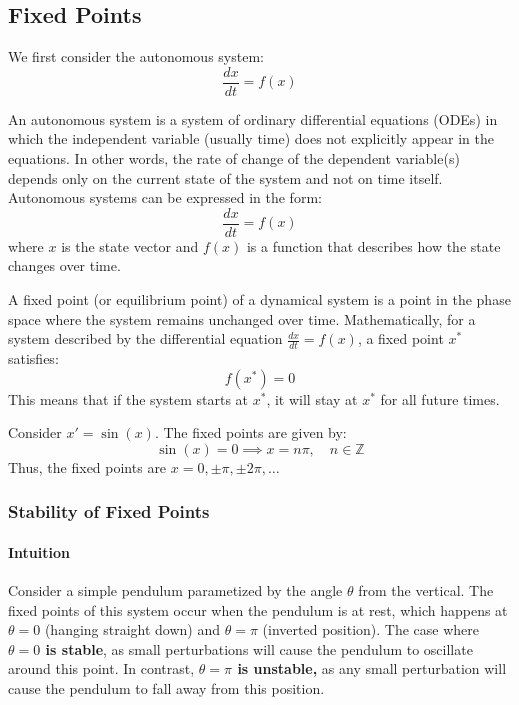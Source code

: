 \documentclass[11pt]{article}
\begin{document}
\subsection{Fixed Points}

We first consider the autonomous system:
\begin{equation}
    \frac{dx}{dt} = f(x)
\end{equation}

\begin{definition}
    An autonomous system is a system of ordinary differential equations (ODEs) in which the independent variable (usually time) does not explicitly appear in the equations. In other words, the rate of change of the dependent variable(s) depends only on the current state of the system and not on time itself. Autonomous systems can be expressed in the form:
    $$
    \frac{dx}{dt} = f(x)
    $$
    where \( x \) is the state vector and \( f(x) \) is a function that describes how the state changes over time.
\end{definition}

\begin{definition}
    A fixed point (or equilibrium point) of a dynamical system is a point in the phase space where the system remains unchanged over time. Mathematically, for a system described by the differential equation \( \frac{dx}{dt} = f(x) \), a fixed point \( x^* \) satisfies:
    $$
    f(x^*) = 0
    $$
    This means that if the system starts at \( x^* \), it will stay at \( x^* \) for all future times.
\end{definition}

\begin{example}
    Consider $x' = \sin(x)$. The fixed points are given by:
    $$
    \sin(x) = 0 \implies x = n\pi, \quad n \in \mathbb{Z}
    $$
    Thus, the fixed points are \( x = 0, \pm \pi, \pm 2\pi, \ldots \)
\end{example}

\subsubsection{Stability of Fixed Points}
\paragraph{Intuition} Consider a simple pendulum parametized by the angle \( \theta \) from the vertical. The fixed points of this system occur when the pendulum is at rest, which happens at \( \theta = 0 \) (hanging straight down) and \( \theta = \pi \) (inverted position). The case where \textbf{\( \theta = 0 \) is stable}, as small perturbations will cause the pendulum to oscillate around this point. In contrast, \textbf{\( \theta = \pi \) is unstable,} as any small perturbation will cause the pendulum to fall away from this position.
\end{document}

